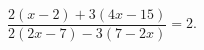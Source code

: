 \begin{ex}[type=equation]
	\begin{condition}
		$\dfrac{2(x- 2)+3(4x - 15)}{2(2x - 7) - 3(7-2x)} = 2.$
	\end{condition}
\end{ex}